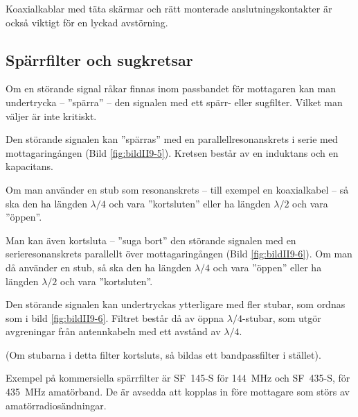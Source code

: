 Koaxialkablar med täta skärmar och rätt monterade anslutningskontakter är också
viktigt för en lyckad avstörning.

\subsection{Spärrfilter och sugkretsar}
\label{spärrfilter}
\label{Sugkretsar}




Om en störande signal råkar finnas inom passbandet för mottagaren kan
man undertrycka -- ''spärra'' -- den signalen med ett spärr- eller sugfilter.
Vilket man väljer är inte kritiskt.

Den störande signalen kan ''spärras'' med en parallellresonanskrets i
serie med mottagaringången (Bild \ref{fig:bildII9-5}).
Kretsen består av en induktans och en kapacitans.

Om man använder en stub som resonanskrets -- till exempel en koaxialkabel -- så
ska den ha längden \(\lambda/4\) och vara ''kortsluten'' eller ha
längden \(\lambda/2\) och vara ''öppen''.

Man kan även kortsluta -- ''suga bort'' den störande signalen med en
serieresonanskrets parallellt över mottagaringången (Bild \ref{fig:bildII9-6}).
Om man då använder en stub, så ska den ha längden \(\lambda/4\) och
vara ''öppen'' eller ha längden \(\lambda/2\) och vara ''kortsluten''.

Den störande signalen kan undertryckas ytterligare med fler stubar,
som ordnas som i bild \ref{fig:bildII9-6}.
Filtret består då av öppna \(\lambda/4\)-stubar, som utgör avgreningar från
antennkabeln med ett avstånd av \(\lambda/4\).

(Om stubarna i detta filter kortsluts, så bildas ett bandpassfilter i stället).

Exempel på kommersiella spärrfilter är SF~145-S för \SI{144}{\mega\hertz} och
SF~435-S, för \SI{435}{\mega\hertz} amatörband.
De är avsedda att kopplas in före mottagare som störs av amatörradiosändningar.

